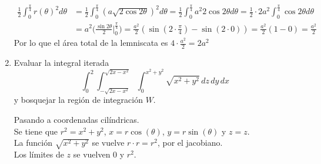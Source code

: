 \documentclass{article}
\begin{document}
\begin{enumerate}
{						\begin{align*}
							\frac{1}{2}\int_0^{\frac{\pi}{4}}{r(\theta)^2 d\theta}
							&= \frac{1}{2}\int_0^{\frac{\pi}{4}}{(a\sqrt{2\cos2\theta})^2 d\theta}
							= \frac{1}{2}\int_0^{\frac{\pi}{4}}{a^2 2\cos2\theta d\theta}
							= \frac{1}{2}\cdot 2a^2 \int_0^{\frac{\pi}{4}}{\cos2\theta d\theta}\\
							&= a^2 \Big (\frac{\sin 2\theta}{2} \Big |_0^{\frac{\pi}{4}} \Big )
							= \frac{a^2}{2} (\sin (2\cdot\frac{\pi}{4}) - \sin (2\cdot0))
							= \frac{a^2}{2} (1-0) = \frac{a^2}{2}
						\end{align*}
						Por lo que el área total de la lemniscata es
						$4 \cdot \frac{a^2}{2} = 2a^2$
        }

        \item {
            Evaluar la integral iterada
            \[
                \int_{0}^{2}{
                    \int_{-\sqrt{2x-x^2}}^{\sqrt{2x-x^2}}{
                        \int_{0}^{x^2+y^2}{
                            \sqrt{x^2+y^2}
                        \,dz}
                    \,dy}
                \,dx}
            \]
            y bosquejar la región de integración $W$.

            \color{azul}
						Pasando a coordenadas cilíndricas.\\
						Se tiene que $r^2 = x^2 + y^2$, $x = r\cos(\theta)$, $y = r\sin(\theta)$
						y $z = z$.\\
						La función $\sqrt{x^2+y^2}$ se vuelve $r \cdot r = r^2$, por el jacobiano.\\
						Los límites de $z$ se vuelven 0 y $r^2$.

}
\end{enumerate}
\end{document}
